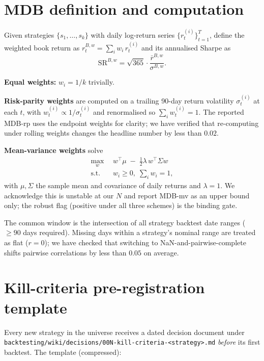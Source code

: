 \documentclass[11pt]{article}
\begin{document}
\section{MDB definition and computation}
\label{app:mdb}

Given strategies $\{s_1, \ldots, s_k\}$ with daily log-return series
$\{r^{(i)}_t\}_{t=1}^T$, define the weighted book return as
$r^{B,w}_t = \sum_i w_i \, r^{(i)}_t$ and its annualised Sharpe as
\begin{equation}
\mathrm{SR}^{B,w} = \sqrt{365} \cdot \frac{\bar{r}^{B,w}}{\sigma^{B,w}}.
\end{equation}

\textbf{Equal weights:} $w_i = 1/k$ trivially.

\textbf{Risk-parity weights} are computed on a trailing 90-day return volatility
$\sigma^{(i)}_t$ at each $t$, with $w^{(i)}_t \propto 1/\sigma^{(i)}_t$ and
renormalised so $\sum_i w^{(i)}_t = 1$. The reported MDB-rp uses the
endpoint weights for clarity; we have verified that re-computing under
rolling weights changes the headline number by less than $0.02$.

\textbf{Mean-variance weights} solve
\begin{align}
\max_w \;& \, w^\top \mu \;-\; \tfrac{1}{2} \lambda \, w^\top \Sigma w \\
\text{s.t.} \;& \, w_i \geq 0,\; \sum_i w_i = 1,
\end{align}
with $\mu, \Sigma$ the sample mean and covariance of daily returns and
$\lambda = 1$. We acknowledge this is unstable at our $N$ and report
MDB-mv as an upper bound only; the robust flag (positive under all three
schemes) is the binding gate.

The common window is the intersection of all strategy backtest date ranges
($\geq 90$ days required). Missing days within a strategy's nominal range
are treated as flat ($r = 0$); we have checked that switching to
NaN-and-pairwise-complete shifts pairwise correlations by less than $0.05$
on average.

\section{Kill-criteria pre-registration template}
\label{app:template}

Every new strategy in the universe receives a dated decision document under
\texttt{backtesting/wiki/decisions/00N-kill-criteria-<strategy>.md}
\emph{before} its first backtest. The template (compressed):
\end{document}
